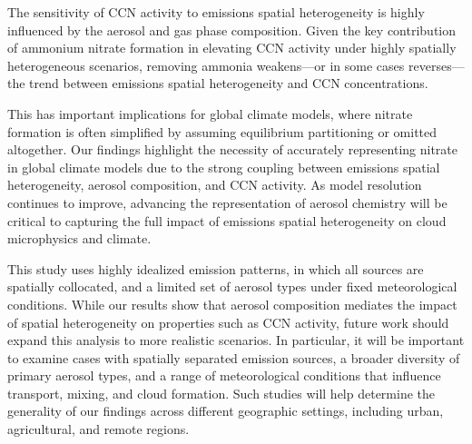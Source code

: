 \documentclass[acp, manuscript]{copernicus}
\begin{document}
The sensitivity of CCN activity to emissions spatial heterogeneity is highly
influenced by the aerosol and gas phase composition. Given the key
contribution of ammonium nitrate formation in elevating CCN activity
under highly spatially heterogeneous scenarios, removing ammonia
weakens---or in some cases reverses---the trend between emissions
spatial heterogeneity and CCN concentrations.

This has important implications for global climate models, where 
nitrate formation is often simplified by assuming equilibrium partitioning 
or omitted altogether. Our findings highlight the necessity of accurately 
representing nitrate in global climate models due to the strong coupling 
between emissions spatial heterogeneity, aerosol composition, and 
CCN activity. As model resolution continues to improve, advancing the 
representation of aerosol chemistry will be critical to capturing the full impact of
emissions spatial heterogeneity on cloud microphysics and climate.

This study uses highly idealized emission patterns, in
which all sources are spatially collocated, and a limited set of
aerosol types under fixed meteorological conditions. While our results
show that aerosol composition mediates the impact of spatial
heterogeneity on properties such as CCN activity, future work should
expand this analysis to more realistic scenarios. In particular, it
will be important to examine cases with spatially separated emission
sources, a broader diversity of primary aerosol types, and a range of
meteorological conditions that influence transport, mixing, and cloud
formation. Such studies will help determine the generality of our
findings across different geographic settings, including urban,
agricultural, and remote regions.



\end{document}
